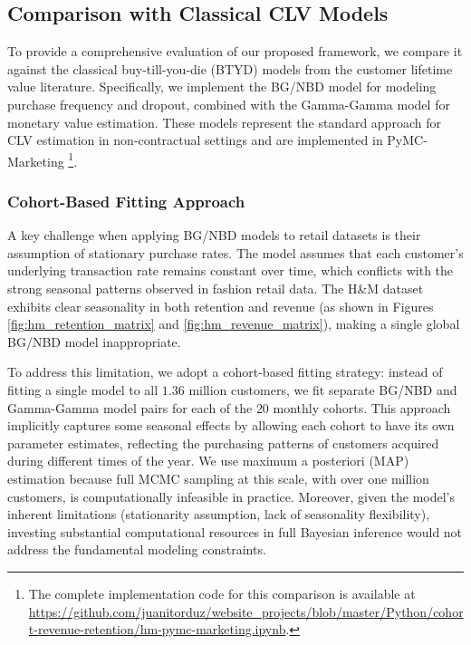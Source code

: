 \documentclass[11pt]{amsart}
\theoremstyle{definition}
\begin{document}
\subsection{Comparison with Classical CLV Models}\label{sec:clv_comparison}

To provide a comprehensive evaluation of our proposed framework, we compare it against the classical buy-till-you-die (BTYD)
models from the customer lifetime value literature. Specifically, we implement the BG/NBD model \cite{FaderHardie2005}
for modeling purchase frequency and dropout, combined with the Gamma-Gamma model \cite{fader2005rfm} for monetary value
estimation. These models represent the standard approach for CLV estimation in non-contractual settings and are
implemented in PyMC-Marketing \cite{pymc_marketing}\footnote{The complete implementation code for this comparison
is available at \url{https://github.com/juanitorduz/website_projects/blob/master/Python/cohort-revenue-retention/hm-pymc-marketing.ipynb}.}.

\subsubsection{Cohort-Based Fitting Approach}

A key challenge when applying BG/NBD models to retail datasets is their assumption of stationary purchase rates.
The model assumes that each customer's underlying transaction rate remains constant over time, which conflicts
with the strong seasonal patterns observed in fashion retail data. The H\&M dataset exhibits clear seasonality
in both retention and revenue (as shown in Figures \ref{fig:hm_retention_matrix} and \ref{fig:hm_revenue_matrix}),
making a single global BG/NBD model inappropriate.

To address this limitation, we adopt a cohort-based fitting strategy: instead of fitting a single model to all
$1.36$ million customers, we fit separate BG/NBD and Gamma-Gamma model pairs for each of the $20$ monthly cohorts.
This approach implicitly captures some seasonal effects by allowing each cohort to have its own parameter estimates,
reflecting the purchasing patterns of customers acquired during different times of the year. We use maximum a
posteriori (MAP) estimation because full MCMC sampling at this scale, with over one million customers, is
computationally infeasible in practice. Moreover, given the model's inherent limitations (stationarity assumption,
lack of seasonality flexibility), investing substantial computational resources in full Bayesian inference would
not address the fundamental modeling constraints.
\end{document}
